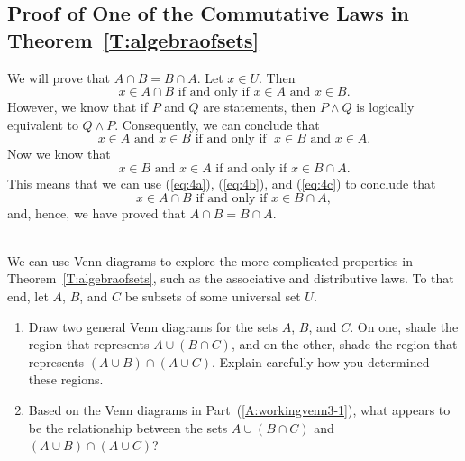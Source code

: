 \setcounter{equation}{0}
\subsection*{Proof of One of the Commutative Laws in Theorem~\ref{T:algebraofsets}}
\begin{myproof}
We will prove that  $A \cap B = B \cap A$.  Let  $x \in U$.  Then
%
\begin{equation} \label{eq:4a}
x \in A \cap B\text{  if and only if  }x \in A\text{  and  }x \in B.
\end{equation}
%
However, we know that if  $P$  and  $Q$  are statements, then  $P \wedge Q$  is logically equivalent to  $Q \wedge P$.  Consequently, we can conclude that
%
\begin{equation} \label{eq:4b}
x \in A\text{ and }x \in B\text{  if and only if }\;x \in B\text{ and }x \in A.
\end{equation}
%
Now we know that
%
\begin{equation} \label{eq:4c}
x \in B\text{ and }x \in A\text{  if and only if  }x \in B \cap A.
\end{equation}
%
This means that we can use (\ref{eq:4a}), (\ref{eq:4b}), and (\ref{eq:4c}) to conclude that
%
\[
x \in A \cap B\text{  if and only if  }x \in B \cap A,
\]
%
and, hence, we have proved that  $A \cap B = B \cap A$.
\end{myproof}


\begin{prog}\label{prog:workingvenn3} \hfill \\ 
We can use Venn diagrams to explore  the more complicated properties in Theorem~\ref{T:algebraofsets}, such as the associative and distributive laws.  To that end, let  $A$, $B$, and  $C$  be subsets of some universal set  $U$. 
\begin{enumerate}
\item Draw two general Venn diagrams for the sets  $A$, $B$, and  $C$.  On one, shade the region that represents  $A \cup \left( {B \cap C} \right)$, and on the other, shade the region that represents  $\left( {A \cup B} \right) \cap \left( {A \cup C} \right)$.  Explain carefully how you determined these regions. 
\label{A:workingvenn3-1}%

\item Based on the Venn diagrams in Part~(\ref{A:workingvenn3-1}), what appears to be the relationship between the sets   $A \cup \left( {B \cap C} \right)$  and   
$\left( {A \cup B} \right) \cap \left( {A \cup C} \right)$?
\end{enumerate}
\end{prog}



